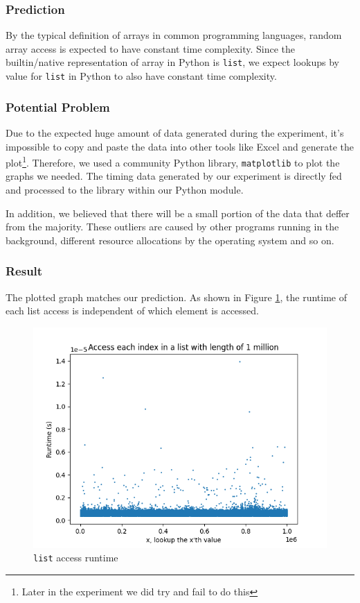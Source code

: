 \documentclass[titlepage, 12pt]{article}
\begin{document}
\subsubsection{Prediction}

By the typical definition of arrays in common programming languages, random
array access is expected to have constant time complexity. Since the
builtin/native representation of array in Python is \texttt{list}, we expect
lookups by value for \texttt{list} in Python to also have constant time
complexity.

\subsubsection{Potential Problem}

Due to the expected huge amount of data generated during the experiment, it's
impossible to copy and paste the data into other tools like Excel and generate
the plot\footnote{Later in the experiment we did try and fail to do this}.
Therefore, we used a community Python library, \texttt{matplotlib} to plot the
graphs we needed. The timing data generated by our experiment is directly fed
and processed to the library within our Python module.

In addition, we believed that there will be a small portion of the data that
deffer from the majority. These outliers are caused by other programs running in
the background, different resource allocations by the operating system and so
on.

\subsubsection{Result}

The plotted graph matches our prediction. As shown in Figure \ref{fig:lookup},
the runtime of each list access is independent of which element is accessed.
\begin{figure}[H]
  \includegraphics[width=0.8\linewidth]{lookup.png}
  \centering
  \caption{\texttt{list} access runtime}
  \label{fig:lookup}
\end{figure}
\end{document}

